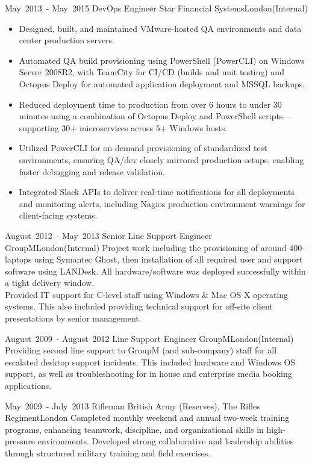 \cventry %
  {\mbox{May 2013 -} \mbox{May 2015}}
  {DevOps Engineer}
  {Star Financial Systems}{London}{(Internal)}
  {
    \begin{itemize}
     \item Designed, built, and maintained VMware-hosted QA environments and data center production servers.
     \item Automated QA build provisioning using PowerShell (PowerCLI) on Windows Server 2008R2, with TeamCity for CI/CD (builds and unit testing) and Octopus Deploy for automated application deployment and MSSQL backups.
     \item Reduced deployment time to production from over 6 hours to under 30 minutes using a combination of Octopus Deploy and PowerShell scripts—supporting 30+ microservices across 5+ Windows hosts.
     \item Utilized PowerCLI for on-demand provisioning of standardized test environments, ensuring QA/dev closely mirrored production setups, enabling faster debugging and release validation.
     \item Integrated Slack APIs to deliver real-time notifications for all deployments and monitoring alerts, including Nagios production environment warnings for client-facing systems. 
    \end{itemize}
    \bigskip
  }

\cventry %
  {\mbox{August 2012 -} \mbox{May 2013}}
  {Senior  Line Support Engineer}
  {GroupM}{London}{(Internal)}
  {
    Project work including the provisioning of around 400-laptops using Symantec Ghost, then installation of all required user and support software using LANDesk. All hardware/software was deployed successfully within a tight delivery window.\\
    Provided IT support for C-level staff using Windows \& Mac OS X operating systems. This also included providing technical support for off-site client presentations by senior management.
    \bigskip
  }

\cventry %
  {\mbox{August 2009 -} \mbox{August 2012}}
  { Line Support Engineer}
  {GroupM}{London}{(Internal)}
  {
    Providing second line support to GroupM (and sub-company) staff for all escalated desktop support incidents. This included hardware and Windows OS support, as well as troubleshooting for in house and enterprise media booking applications.
    \bigskip
  }

\cventry %
  {\mbox{May 2009 -} \mbox{July 2013}}
  {Rifleman}
  {British Army (Reserves), The Rifles Regiment}{London}{}
  {
    Completed monthly weekend and annual two-week training programs, enhancing teamwork, discipline, and organizational skills in high-pressure environments. Developed strong collaborative and leadership abilities through structured military training and field exercises.
    \bigskip
  }

